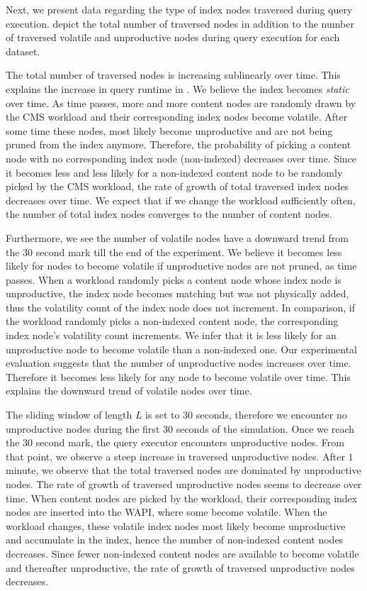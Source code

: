 \documentclass[abstracton,12pt]{scrartcl}
\theoremstyle{definition}
\begin{document}
Next, we present data regarding the type of index nodes traversed during query
execution.
 depict
the total number of traversed nodes in addition to the number of traversed
volatile and unproductive nodes during query execution for each dataset.

The total number of traversed nodes is increasing sublinearly over time. This
explains the increase in query runtime in
.
We believe the index becomes \textit{static} over time.
As time passes, more and more content nodes are randomly
drawn by the CMS workload and their corresponding index nodes become
volatile. After some time these nodes, most likely become unproductive and are
not  being pruned from the index anymore.
Therefore, the probability of picking a content node with no corresponding index
node (non-indexed)
decreases over time. Since it becomes less and less likely for a non-indexed content node
to be randomly picked by the CMS workload, the rate of growth of total traversed
index nodes decreases over time. We expect that if we change the workload
sufficiently often, the number of total index nodes converges to the number of
content nodes.

Furthermore, we see the number of volatile nodes have a downward trend from the
30 second mark till the end of the experiment. We believe it becomes less likely
for nodes to become volatile if unproductive nodes are not pruned,
as time passes. When a workload randomly picks a content node whose index node is
unproductive, the index
node becomes matching but was not physically added, thus the volatility count of
the index node
does not increment. In comparison, if the workload randomly picks a non-indexed
content node, the corresponding index node's volatility count increments.
We infer that it is less
likely for an unproductive node to become volatile than a non-indexed one.
Our experimental evaluation suggests that the number of
unproductive nodes increases over time. Therefore it becomes less likely for any
node to become volatile over time. This explains the downward trend of
volatile nodes over time.

The sliding window of length $L$ is set to $30$ seconds, therefore we encounter no
unproductive nodes during the first $30$ seconds of the simulation. Once we
reach the $30$ second mark, the query executor encounters unproductive nodes.
From that point, we observe a steep increase in traversed unproductive nodes.
After $1$ minute, we observe that the total traversed nodes are dominated by
unproductive nodes. The rate of growth of traversed unproductive nodes seems to
decrease over time. When content nodes are picked by the
workload, their corresponding index nodes are inserted into the WAPI, where some
become volatile. When the workload changes, these volatile index nodes most
likely become unproductive and accumulate in the index, hence the number of non-indexed
content nodes decreases. Since fewer non-indexed content nodes are
available to become volatile and thereafter unproductive, the rate of growth of
traversed unproductive nodes decreases.
\end{document}
